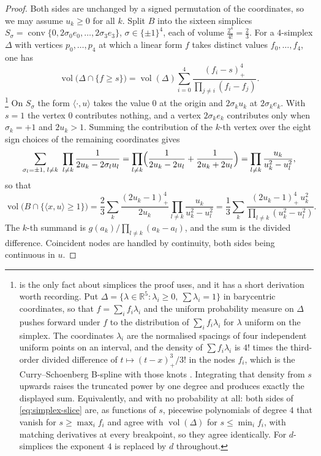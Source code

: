 \documentclass[11pt,reqno]{amsart}
\renewcommand{\_}{\origunderscore\allowbreak}
\numberwithin{equation}{section}
\theoremstyle{plain}
\theoremstyle{definition}
\theoremstyle{remark}
\DeclareMathOperator{\vol}{vol}
\DeclareMathOperator{\conv}{conv}
\begin{document}
\begin{proof}
Both sides are unchanged by a signed permutation of the coordinates, so we
may assume $u_k\ge0$ for all $k$. Split $B$ into the sixteen simplices
$S_\sigma=\conv\{0,2\sigma_0e_0,\dots,2\sigma_3e_3\}$,
$\sigma\in\{\pm1\}^4$, each of volume $\tfrac{2^4}{4!}=\tfrac23$. For a
$4$-simplex $\Delta$ with vertices $p_0,\dots,p_4$ at which a linear form
$f$ takes distinct values $f_0,\dots,f_4$, one has
\begin{equation}\label{eq:simplex-slice}
  \vol\bigl(\Delta\cap\{f\ge s\}\bigr)
  =\vol(\Delta)\sum_{i=0}^{4}\frac{(f_i-s)_+^4}{\prod_{j\ne i}(f_i-f_j)} .
\end{equation}%
\footnote{ is the only fact about simplices the
  proof uses, and it has a short derivation worth recording. Put
  $\Delta=\{\lambda\in\mathbb{R}^{5}:\lambda_i\ge0,\ \sum\lambda_i=1\}$
  in barycentric coordinates, so that $f=\sum_i f_i\lambda_i$ and the
  uniform probability measure on $\Delta$ pushes forward under $f$ to
  the distribution of $\sum_i f_i\lambda_i$ for $\lambda$ uniform on the
  simplex. The coordinates $\lambda_i$ are the normalised spacings of
  four independent uniform points on an interval, and the density of
  $\sum f_i\lambda_i$ is $4!$ times the third-order divided difference
  of $t\mapsto(t-x)_+^{3}/3!$ in the nodes $f_i$, which is the
  Curry--Schoenberg B-spline with those knots \cite{CSc66}. Integrating
  that density from $s$ upwards raises the truncated power by one degree
  and produces exactly the displayed sum. Equivalently, and with no
  probability at all: both sides of \cref{eq:simplex-slice} are, as
  functions of $s$, piecewise polynomials of degree $4$ that vanish for
  $s\ge\max_if_i$ and agree with $\vol(\Delta)$ for $s\le\min_if_i$,
  with matching derivatives at every breakpoint, so they agree
  identically. For $d$-simplices the exponent $4$ is replaced by $d$
  throughout.}
On $S_\sigma$ the form $\langle\cdot,u\rangle$ takes the value $0$ at the
origin and $2\sigma_ku_k$ at $2\sigma_ke_k$. With $s=1$ the vertex $0$
contributes nothing, and a vertex $2\sigma_ke_k$ contributes only when
$\sigma_k=+1$ and $2u_k>1$. Summing the contribution of the $k$-th vertex
over the eight sign choices of the remaining coordinates gives
\[
  \sum_{\sigma_l=\pm1,\;l\ne k}\ \prod_{l\ne k}\frac{1}{2u_k-2\sigma_lu_l}
  =\prod_{l\ne k}\Bigl(\frac{1}{2u_k-2u_l}+\frac{1}{2u_k+2u_l}\Bigr)
  =\prod_{l\ne k}\frac{u_k}{u_k^2-u_l^2},
\]
so that
\[
  \vol\bigl(B\cap\{\langle x,u\rangle\ge1\}\bigr)
  =\frac23\sum_{k}\frac{(2u_k-1)_+^4}{2u_k}\prod_{l\ne k}\frac{u_k}{u_k^2-u_l^2}
  =\frac13\sum_{k}\frac{(2u_k-1)_+^4\,u_k^2}{\prod_{l\ne k}(u_k^2-u_l^2)} .
\]
The $k$-th summand is $g(a_k)/\prod_{l\ne k}(a_k-a_l)$, and the sum is the
divided difference. Coincident nodes are handled by continuity, both sides
being continuous in $u$.
\end{proof}
\end{document}
